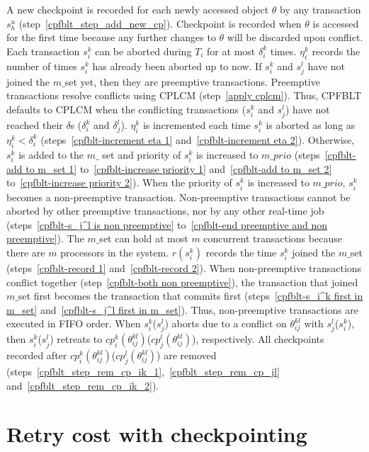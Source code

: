 \documentclass[preprint]{sigplanconf}
\begin{document}
%
A new checkpoint is recorded for each newly accessed object $\theta$ by any transaction $s_h^u$ (step~\ref{cpfblt_step_add_new_cp}). Checkpoint is recorded when $\theta$ is accessed for the first time because any further changes to $\theta$ will be discarded upon conflict. Each transaction $s_{i}^{k}$ can be aborted during $T_i$ for at most $\delta_{i}^{k}$ times. $\eta_{i}^{k}$ records  the number of times $s_{i}^{k}$ has already been aborted up to now. If $s_i^k$ and $s_j^l$ have not joined the $m\_$set yet, then they are preemptive transactions. Preemptive transactions resolve conflicts using CPLCM (step~\ref{apply cplcm}). Thus, CPFBLT defaults to CPLCM when the conflicting transactions ($s_i^k$ and $s_j^l$) have not reached their $\delta$s ($\delta_i^k$ and $\delta_j^l$). $\eta_i^k$ is incremented each time $s_{i}^k$ is aborted as long as $\eta_i^k < \delta_i^k$ (steps~\ref{cpfblt-increment eta 1} and~\ref{cpfblt-increment eta 2}). Otherwise, $s_i^k$ is added to the $m\_$ set and priority of $s_{i}^k$ is increased to $m\_prio$ (steps~\ref{cpfblt-add to m_set 1} to~\ref{cpfblt-increase priority 1} and~\ref{cpfblt-add to m_set 2} to~\ref{cpfblt-increase priority 2}). When the priority of $s_i^k$ is increased to $m\_prio$, $s_i^k$ becomes a non-preemptive transaction. Non-preemptive transactions cannot be aborted by other preemptive transactions, nor by any other real-time job (steps~\ref{cpfblt-s_j^l is non preemptive} to~\ref{cpfblt-end preemptive and non preemptive}). The $m\_$set can hold at most $m$ concurrent transactions because there are $m$ processors in the system. $r(s_i^k)$ records the time $s_i^k$ joined the $m\_$set (steps~\ref{cpfblt-record 1} and~\ref{cpfblt-record 2}). When non-preemptive transactions conflict together (step~\ref{cpfblt-both non preemptive}), the transaction that joined $m\_$set first becomes the transaction that commits first (steps~\ref{cpfblt-s_i^k first in m_set} and~\ref{cpfblt-s_j^l first in m_set}). Thus, non-preemptive transactions are executed in FIFO order. When $s_i^k$($s_j^l$) aborts due to a conflict on $\theta_{ij}^{kl}$ with $s_j^l$($s_i^k$), then $s_i^k$($s_j^l$) retreats to $cp_i^k(\theta_{ij}^{kl})$($cp_j^l(\theta_{ij}^{kl})$), respectively. All checkpoints recorded after $cp_i^k(\theta_{ij}^{kl})$($cp_j^l(\theta_{ij}^{kl})$) are removed (steps~\ref{cpfblt_step_rem_cp_ik_1},~\ref{cpfblt_step_rem_cp_jl} and~\ref{cpfblt_step_rem_cp_ik_2}). 

\section{Retry cost with checkpointing}\label{sec:cpfblt rc}
\end{document}
